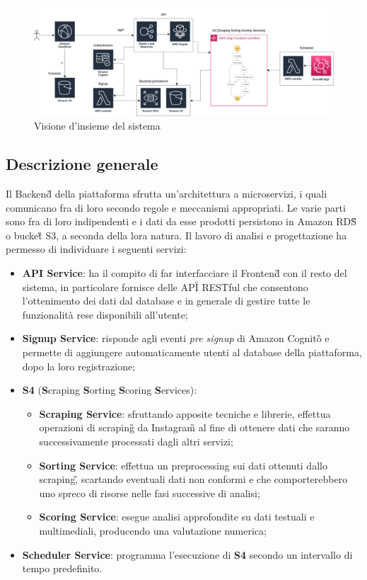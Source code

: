 \begin{figure}[!h]
    \includegraphics[width=16cm]{sezioni/images/overview.png}
    \centering
    \caption{Visione d'insieme del sistema}
\end{figure}

\subsection{Descrizione generale}
Il Backend\G{} della piattaforma sfrutta un'architettura a microservizi, i quali comunicano fra di loro secondo regole e meccanismi appropriati.
Le varie parti sono fra di loro indipendenti e i dati da esse prodotti persistono in Amazon RDS\G{} o bucket\G{} S3, a seconda della lora natura.
Il lavoro di analisi e progettazione ha permesso di individuare i seguenti servizi:
\begin{itemize}
    \item \textbf{API Service}: ha il compito di far interfacciare il Frontend\G{} con il resto del sistema, in particolare fornisce
    delle API\G{} RESTful che consentono l'ottenimento dei dati dal database e in generale di gestire tutte le funzionalità rese disponibili all'utente;
    \item \textbf{Signup Service}: risponde agli eventi \textit{pre signup} di Amazon Cognito\G{} e permette di aggiungere automaticamente utenti al database della piattaforma, dopo la loro registrazione;
    \item \textbf{S4} (\textbf{S}craping \textbf{S}orting \textbf{S}coring \textbf{S}ervices):
        \begin{itemize}
            \item \textbf{Scraping Service}: sfruttando apposite tecniche e librerie, effettua operazioni di scraping\G{} da Instagram\G{} al fine di ottenere dati che
            saranno successivamente processati dagli altri servizi;
            \item \textbf{Sorting Service}: effettua un preprocessing sui dati ottenuti dallo scraping\G, scartando eventuali dati non conformi e che comporterebbero
            uno spreco di risorse nelle fasi successive di analisi;
            \item \textbf{Scoring Service}: esegue analisi approfondite su dati testuali e multimediali, producendo una valutazione numerica; 
        \end{itemize}
    \item \textbf{Scheduler Service}: programma l'esecuzione di \textbf{S4} secondo un intervallo di tempo predefinito.
\end{itemize}

